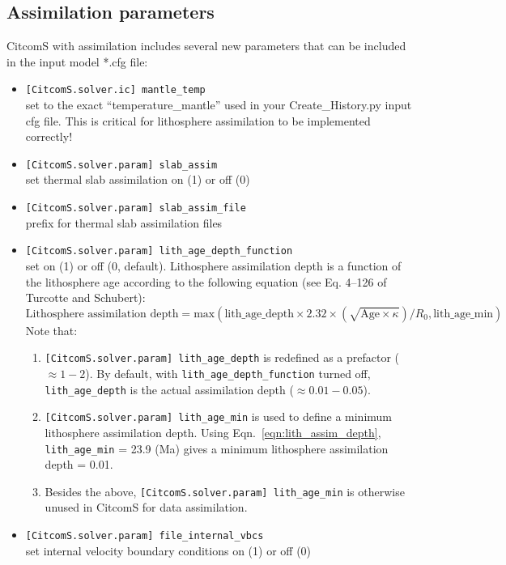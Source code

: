 \documentclass[letterpaper,12pt]{article}
\begin{document}
\subsection{Assimilation parameters}
\label{ss:assim_param}
CitcomS with assimilation includes several new parameters that can be included in the input model *.cfg file:
\begin{itemize}
\item \verb#[CitcomS.solver.ic] mantle_temp#\\ set to the exact ``temperature\_mantle'' used in your Create\_History.py input cfg file.  This is critical for lithosphere assimilation to be implemented correctly!
\item \verb#[CitcomS.solver.param] slab_assim#\\ set thermal slab assimilation on (1) or off (0)
\item \verb#[CitcomS.solver.param] slab_assim_file#\\ prefix for thermal slab assimilation files
\item \verb#[CitcomS.solver.param] lith_age_depth_function#\\ set on (1) or off (0, default).  Lithosphere assimilation depth is a function of the lithosphere age according to the following equation (see Eq. 4--126 of Turcotte and Schubert):
\begin{equation}
\label{eqn:lith_assim_depth}
\textrm{Lithosphere assimilation depth} =  \textrm{max}(\textrm{lith\_age\_depth} \times 2.32 \times (\sqrt{\textrm{Age} \times \kappa}) / R_0, \textrm{lith\_age\_min})
\end{equation}
Note that:
\begin{enumerate}
\item \verb#[CitcomS.solver.param] lith_age_depth# is redefined as a prefactor ($\approx 1-2$).  By default, with \verb#lith_age_depth_function# turned off, \verb#lith_age_depth# is the actual assimilation depth ($\approx 0.01-0.05$).
\item \verb#[CitcomS.solver.param] lith_age_min# is used to define a minimum lithosphere assimilation depth.  Using Eqn.~\ref{eqn:lith_assim_depth}, \verb#lith_age_min# = 23.9 (Ma) gives a minimum lithosphere assimilation depth = 0.01.
\item Besides the above, \verb#[CitcomS.solver.param] lith_age_min# is otherwise unused in CitcomS for data assimilation.
\end{enumerate}
\item \verb#[CitcomS.solver.param] file_internal_vbcs#\\ set internal velocity boundary conditions on (1) or off (0)

\end{itemize}
\end{document}
